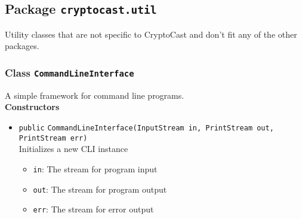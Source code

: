 \subsection{Package \lstinline!cryptocast.util!}
Utility classes that are not specific to CryptoCast and don't fit any of the other packages.
\subsubsection{Class \lstinline|CommandLineInterface|}
A simple framework for command line programs. \\




\textbf{Constructors}
\begin{itemize}
\item \lstinline|public| \lstinline|CommandLineInterface|\lstinline|(InputStream in, PrintStream out, PrintStream err)|\\
Initializes a new CLI instance
\begin{itemize}
\item \lstinline|in|: The stream for program input
\item \lstinline|out|: The stream for program output
\item \lstinline|err|: The stream for error output
\end{itemize}



\end{itemize}


